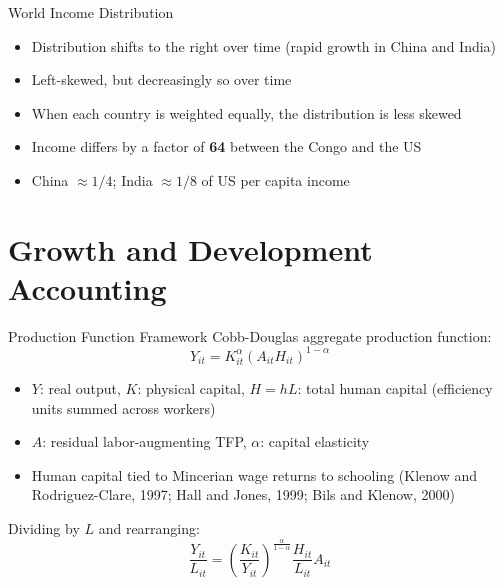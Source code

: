 \documentclass[blue]{beamer}
\begin{document}
\begin{frame}{World Income Distribution}

	
	\begin{itemize}
		\item Distribution shifts to the right over time (rapid growth in China and India)
		\item Left-skewed, but decreasingly so over time
		\item When each country is weighted equally, the distribution is less skewed
	\end{itemize}
	
	\bigskip

	\begin{itemize}
		\item Income differs by a factor of \textbf{64} between the Congo and the US
		\item China $\approx 1/4$; India $\approx 1/8$ of US per capita income
	\end{itemize}
\end{frame}


\section{Growth and Development Accounting}

\begin{frame}{Production Function Framework}
	Cobb-Douglas aggregate production function:
	\[
	Y_{it} = K_{it}^\alpha (A_{it} H_{it})^{1-\alpha}
	\]
	
	\begin{itemize}
		\item $Y$: real output, $K$: physical capital, $H = hL$: total human capital (efficiency units summed across workers)
		\item $A$: residual labor-augmenting TFP, $\alpha$: capital elasticity
		\item Human capital tied to Mincerian wage returns to schooling (Klenow and Rodriguez-Clare, 1997; Hall and Jones, 1999; Bils and Klenow, 2000)
	\end{itemize}
	
	\bigskip
	Dividing by $L$ and rearranging:
	\[
	\frac{Y_{it}}{L_{it}} = \left(\frac{K_{it}}{Y_{it}}\right)^{\frac{\alpha}{1-\alpha}} \frac{H_{it}}{L_{it}}  A_{it} 
	\]
\end{frame}
\end{document}
